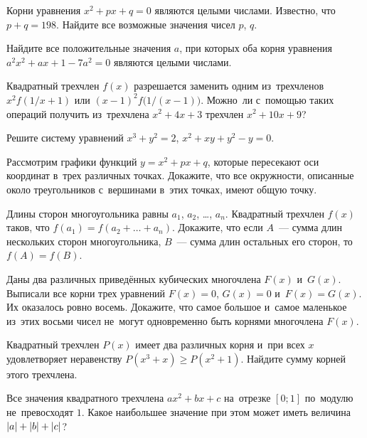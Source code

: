 \begin{problems}

\item
Корни уравнения $x^2 + p x + q = 0$ являются целыми числами.
Известно, что $p + q = 198$.
Найдите все возможные значения чисел $p$, $q$.

\item
Найдите все положительные значения $a$, при которых оба корня уравнения
$a^2 x^2 + a x + 1 - 7 a^2 = 0$ являются целыми числами.

\item
Квадратный трехчлен $f(x)$ разрешается заменить одним из~трехчленов
$x^2 f(1 / x + 1)$ или $(x - 1)^2 f\bigl(1 / (x-1)\bigr)$.
Можно~ли с~помощью таких операций получить из~трехчлена $x^2 + 4 x + 3$
трехчлен $x^2 + 10 x + 9$?

\item
Решите систему уравнений\enspace
$x^3 + y^2 = 2$,\enspace
$x^2 + x y + y^2 - y = 0$.

\item
Рассмотрим графики функций $y = x^2 + p x + q$, которые пересекают оси
координат в~трех различных точках.
Докажите, что все окружности, описанные около треугольников с~вершинами в~этих
точках, имеют общую точку.

\item
Длины сторон многоугольника равны $a_{1}$, $a_{2}$, \ldots, $a_{n}$.
Квадратный трехчлен $f(x)$ таков, что $f(a_{1}) = f(a_{2} + \ldots + a_{n})$.
Докажите, что если $A$~--- сумма длин нескольких сторон многоугольника,
$B$~--- сумма длин остальных его сторон, то~$f(A) = f(B)$.

\item
Даны два различных приведённых кубических многочлена $F(x)$ и~$G(x)$.
Выписали все корни трех уравнений $F(x) = 0$, $G(x) = 0$ и~$F(x) = G(x)$.
Их оказалось ровно восемь.
Докажите, что самое большое и~самое маленькое из~этих восьми чисел не~могут
одновременно быть корнями многочлена $F(x)$.

\item
Квадратный трехчлен $P(x)$ имеет два различных корня и~при всех $x$
удовлетворяет неравенству $P(x^3 + x) \geq P(x^2 + 1)$.
Найдите сумму корней этого трехчлена.

\item
Все значения квадратного трехчлена $a x^2 + b x + c$ на~отрезке $[0; 1]$
по~модулю не~превосходят $1$.
Какое наибольшее значение при этом может иметь величина
$\lvert a \rvert + \lvert b \rvert + \lvert c \rvert$?


\end{problems}
